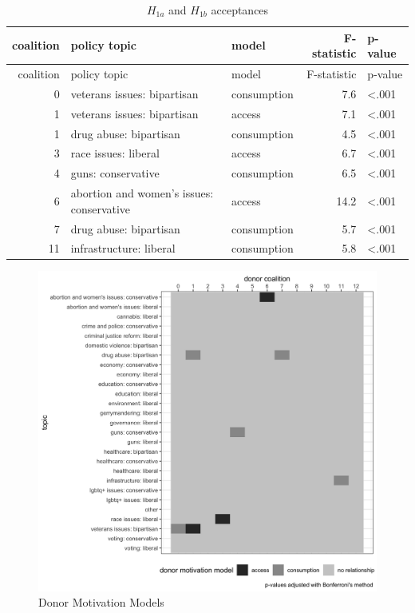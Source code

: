 \documentclass[12pt,]{article}
\begin{document}
\begin{longtable}[]{@{}rllrl@{}}
\caption{\(H_{1a}\) and \(H_{1b}\) acceptances}\tabularnewline
\toprule
coalition & policy topic & model & F-statistic & p-value \\
\midrule
\endfirsthead
\toprule
coalition & policy topic & model & F-statistic & p-value \\
\midrule
\endhead
0 & veterans issues: bipartisan & consumption & 7.6 & \textless.001 \\
1 & veterans issues: bipartisan & access & 7.1 & \textless.001 \\
1 & drug abuse: bipartisan & consumption & 4.5 & \textless.001 \\
3 & race issues: liberal & access & 6.7 & \textless.001 \\
4 & guns: conservative & consumption & 6.5 & \textless.001 \\
6 & abortion and women's issues: conservative & access & 14.2 &
\textless.001 \\
7 & drug abuse: bipartisan & consumption & 5.7 & \textless.001 \\
11 & infrastructure: liberal & consumption & 5.8 & \textless.001 \\
\bottomrule
\end{longtable}

\begin{figure}
\centering
\includegraphics{../tables_and_figures/fig_2.jpg}
\caption{Donor Motivation Models}
\end{figure}
\end{document}
